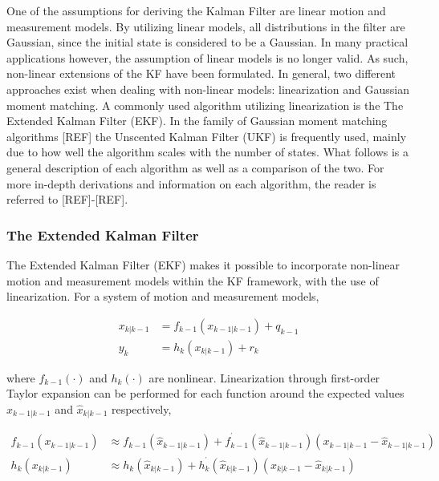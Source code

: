 One of the assumptions for deriving the Kalman Filter are linear motion and measurement models. By utilizing linear models, all distributions in the filter are Gaussian, since the initial state is considered to be a Gaussian. In many practical applications however, the assumption of linear models is no longer valid. As such, non-linear extensions of the KF have been formulated. In general, two different approaches exist when dealing with non-linear models: linearization and Gaussian moment matching. A commonly used algorithm utilizing linearization is the The Extended Kalman Filter (EKF). In the family of Gaussian moment matching algorithms [REF] the Unscented Kalman Filter (UKF) is frequently used, mainly due to how well the algorithm scales with the number of states. What follows is a general description of each algorithm as well as a comparison of the two. For more in-depth derivations and information on each algorithm, the reader is referred to [REF]-[REF].

\subsubsection{The Extended Kalman Filter}
The Extended Kalman Filter (EKF) makes it possible to incorporate non-linear motion and measurement models within the KF framework, with the use of linearization. For a system of motion and measurement models, 

\begin{equation}
	\begin{split}
		x_{k|k-1} &= f_{k-1}(x_{k-1|k-1}) + q_{k-1} \\
		y_{k}     &= h_{k}(x_{k|k-1}) + r_{k}
	\end{split}
\end{equation}

where $f_{k-1}(\cdot)$ and $h_{k}(\cdot)$ are nonlinear. Linearization through first-order Taylor expansion can be performed for each function around the expected values $\hat{x}_{k-1|k-1}$ and $\hat{x}_{k|k-1}$ respectively, 

\begin{equation}
	\begin{split}
		f_{k-1}(x_{k-1|k-1}) &\approx f_{k-1}(\hat{x}_{k-1|k-1}) + f_{k-1}^{^\prime}(\hat{x}_{k-1|k-1})(x_{k-1|k-1}-\hat{x}_{k-1|k-1}) \\
		h_{k}(x_{k|k-1})     &\approx h_{k}(\hat{x}_{k|k-1}) + h_{k}^{^\prime}(\hat{x}_{k|k-1})(x_{k|k-1}-\hat{x}_{k|k-1}) 
	\end{split}
\end{equation}

